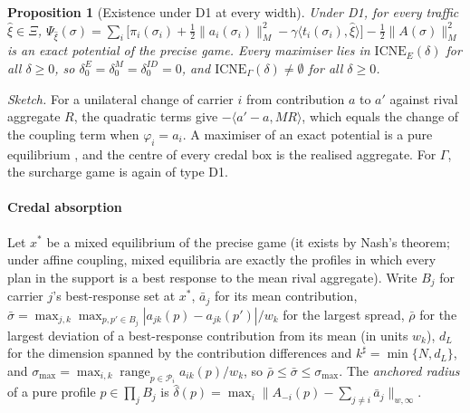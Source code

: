 \documentclass[preprint,11pt]{elsarticle}
\newtheorem{proposition}[theorem]{Proposition}
\theoremstyle{definition}
\theoremstyle{remark}
\newcommand{\cP}{\mathcal{P}}
\newcommand{\ICNE}{\mathrm{ICNE}}
\newcommand{\ip}[2]{\langle #1,#2\rangle}
\begin{document}
\begin{proposition}[Existence under D1 at every width]\label{prop:D1}
Under D1, for every traffic $\hat\xi\in\Xi$, $\Psi_{\hat\xi}(\sigma)=\sum_i\big[\pi_i(\sigma_i)+\tfrac12\|a_i(\sigma_i)\|_M^2-\gamma\ip{t_i(\sigma_i)}{\hat\xi}\big]-\tfrac12\|A(\sigma)\|_M^2$ is an exact potential of the precise game. Every maximiser lies in $\ICNE_E(\delta)$ for all $\delta\ge0$, so $\delta_0^E=\delta_0^M=\delta_0^{ID}=0$, and $\ICNE_\Gamma(\delta)\neq\emptyset$ for all $\delta\ge0$.
\end{proposition}
\emph{Sketch.} For a unilateral change of carrier $i$ from contribution $a$ to $a'$ against rival aggregate $R$, the quadratic terms give $-\ip{a'-a}{MR}$, which equals the change of the coupling term when $\varphi_i=a_i$. A maximiser of an exact potential is a pure equilibrium \citep{Monderer1996}, and the centre of every credal box is the realised aggregate. For $\Gamma$, the surcharge game is again of type D1.

\paragraph{Credal absorption} Let $x^*$ be a mixed equilibrium of the precise game (it exists by Nash's theorem; under affine coupling, mixed equilibria are exactly the profiles in which every plan in the support is a best response to the mean rival aggregate). Write $B_j$ for carrier $j$'s best-response set at $x^*$, $\bar a_j$ for its mean contribution, $\bar\sigma=\max_{j,k}\max_{p,p'\in B_j}|a_{jk}(p)-a_{jk}(p')|/w_k$ for the largest spread, $\bar\rho$ for the largest deviation of a best-response contribution from its mean (in units $w_k$), $d_L$ for the dimension spanned by the contribution differences and $k^\sharp=\min\{N,d_L\}$, and $\sigma_{\max}=\max_{i,k}\operatorname{range}_{p\in\cP_i}a_{ik}(p)/w_k$, so $\bar\rho\le\bar\sigma\le\sigma_{\max}$. The \emph{anchored radius} of a pure profile $p\in\prod_jB_j$ is $\hat\delta(p)=\max_i\|A_{-i}(p)-\sum_{j\ne i}\bar a_j\|_{w,\infty}$.
\end{document}

